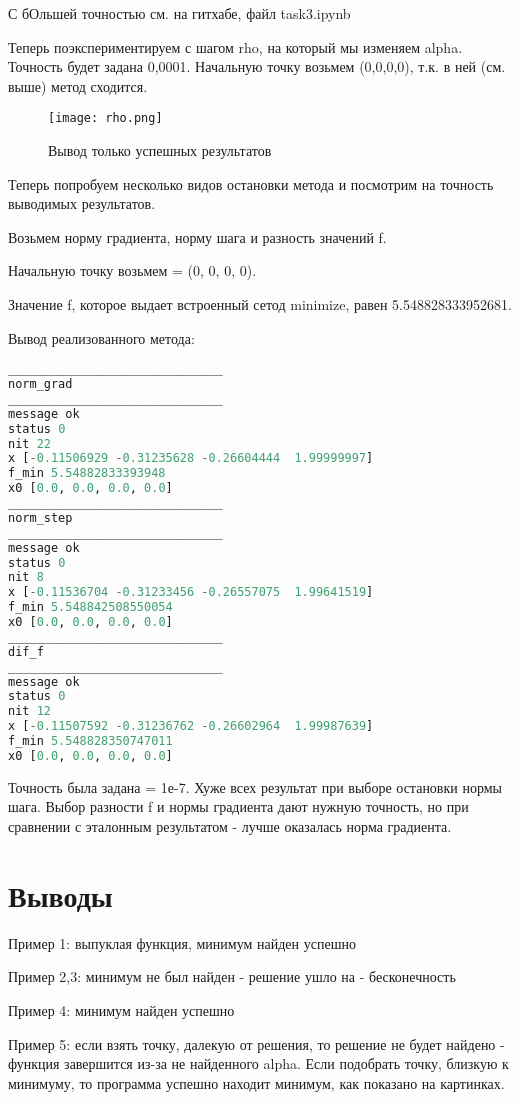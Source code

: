 \documentclass{article}
\begin{document}
С бОльшей точностью см. на гитхабе, файл task3.ipynb


Теперь поэкспериментируем с шагом rho, на который мы изменяем alpha.
Точность будет задана 0,0001.
Начальную точку возьмем (0,0,0,0), т.к. в ней (см. выше) метод сходится.

\begin{figure}[H]
    \centering
    \texttt{[image: rho.png]}
    \caption{Вывод только успешных результатов}
\end{figure}


\newpage
Теперь попробуем несколько видов остановки метода и посмотрим на точность выводимых результатов.

Возьмем норму градиента, норму шага и разность значений f.

Начальную точку возьмем = (0, 0, 0, 0).

Значение f, которое выдает встроенный сетод minimize, равен 5.548828333952681.

Вывод реализованного метода:

\begin{lstlisting}[language=Python]
______________________________
norm_grad
______________________________
message ok
status 0
nit 22
x [-0.11506929 -0.31235628 -0.26604444  1.99999997]
f_min 5.54882833393948
x0 [0.0, 0.0, 0.0, 0.0]
______________________________
norm_step
______________________________
message ok
status 0
nit 8
x [-0.11536704 -0.31233456 -0.26557075  1.99641519]
f_min 5.548842508550054
x0 [0.0, 0.0, 0.0, 0.0]
______________________________
dif_f
______________________________
message ok
status 0
nit 12
x [-0.11507592 -0.31236762 -0.26602964  1.99987639]
f_min 5.548828350747011
x0 [0.0, 0.0, 0.0, 0.0]
\end{lstlisting}

Точность была задана = 1е-7. Хуже всех результат при выборе остановки нормы шага. Выбор разности f и нормы градиента дают нужную точность, но при сравнении с эталонным результатом - лучше оказалась норма градиента.

\newpage
\section{Выводы}
Пример 1: выпуклая функция, минимум найден успешно

Пример 2,3: минимум не был найден - решение ушло на - бесконечность

Пример 4: минимум найден успешно

Пример 5: если взять точку, далекую от решения, то решение не будет найдено - функция завершится из-за не найденного alpha. Если подобрать точку, близкую к минимуму, то программа успешно находит минимум, как показано на картинках.
\end{document}
